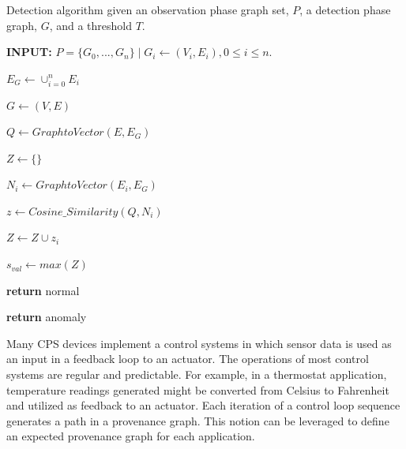 \begin{algorithm}[h!]

\caption{Detection algorithm given an observation phase graph set, $P$, a detection phase graph, $G$, and a threshold $T$.} 
 \label{alg:graph_anomaly} 

\begin{algorithmic}[1]  


\State \textbf{INPUT: } $P=\{G_0,...,G_n\} \mid G_i\gets (V_i, E_i), 0 \leq i \leq n.$

\State $E_G \gets \cup_{i=0}^{n} E_i$

\State $G \gets (V, E)$

\State $Q \gets GraphtoVector(E, E_G)$ 

\State $Z \gets \{\}$

\State $N_i \gets GraphtoVector(E_i, E_G)$

\State $z \gets Cosine\_Similarity(Q, N_i)$

\State $Z \gets Z \cup z_i$

\EndFor	

\State $s_{val} \gets max(Z)$

\State \textbf{return} normal

\EndIf

\State \textbf{return} anomaly
\EndProcedure
\end{algorithmic}
\end{algorithm}

\par Many CPS devices implement a control systems in which sensor data is used as an input in a feedback loop to an actuator. The operations of most control systems are regular and predictable. For example, in a thermostat application, temperature readings generated might be converted from Celsius to Fahrenheit and utilized as feedback to an actuator. Each iteration of a control loop sequence generates a path in a provenance graph. This notion can be leveraged to define an expected provenance graph for each application. 

